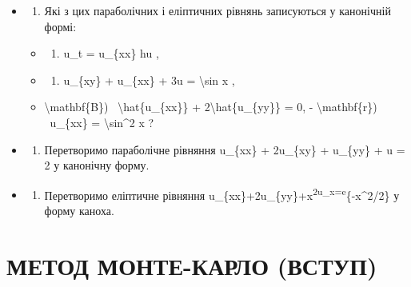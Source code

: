 \documentclass[
]{article}
\providecommand{\tightlist}{%
  \setlength{\itemsep}{0pt}\setlength{\parskip}{0pt}}
\begin{document}
\begin{itemize}
\item
  \begin{enumerate}
  \def\labelenumi{\arabic{enumi}.}
  \tightlist
  \item
    Які з цих параболічних і еліптичних рівнянь записуються у канонічній
    формі:
  \end{enumerate}

  \begin{itemize}
  \tightlist
  \item
    \begin{enumerate}
    \def\labelenumi{\alph{enumi})}
    \tightlist
    \item
      u\_t = u\_\{xx\} hu ,
    \end{enumerate}
  \item
    \begin{enumerate}
    \def\labelenumi{\arabic{enumi})}
    \setcounter{enumi}{5}
    \tightlist
    \item
      u\_\{xy\} + u\_\{xx\} + 3u = \textbackslash sin x ,
    \end{enumerate}
  \item
    \textbackslash mathbf\{B\}) ~\textbackslash hat\{u\_\{xx\}\} +
    2\textbackslash hat\{u\_\{yy\}\} = 0, - \textbackslash mathbf\{r\})
    ~u\_\{xx\} = \textbackslash sin\^{}2 x ?
  \end{itemize}
\item
  \begin{enumerate}
  \def\labelenumi{\arabic{enumi}.}
  \setcounter{enumi}{1}
  \tightlist
  \item
    Перетворимо параболічне рівняння u\_\{xx\} + 2u\_\{xy\} + u\_\{yy\}
    + u = 2 у канонічну форму.
  \end{enumerate}
\item
  \begin{enumerate}
  \def\labelenumi{\arabic{enumi}.}
  \setcounter{enumi}{2}
  \tightlist
  \item
    Перетворимо еліптичне рівняння
    u\_\{xx\}+2u\_\{yy\}+x\textsuperscript{2u\_x=e}\{-x\^{}2/2\} у форму
    каноха.
  \end{enumerate}
\end{itemize}

\section{МЕТОД МОНТЕ-КАРЛО
(ВСТУП)}\label{ux43cux435ux442ux43eux434-ux43cux43eux43dux442ux435-ux43aux430ux440ux43bux43e-ux432ux441ux442ux443ux43f}
\end{document}
